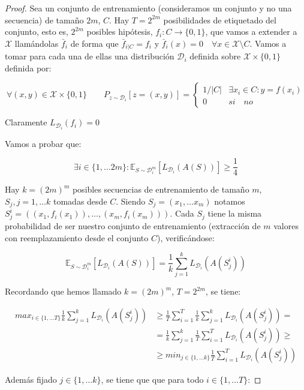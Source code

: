 \documentclass[11pt]{article}
\begin{document}
\begin{proof}
Sea un conjunto de entrenamiento (consideramos un conjunto y no una secuencia) de tamaño $2m$, $C$. Hay $T = 2^{2m}$ posibilidades de etiquetado del conjunto, esto es, $2^{2m}$ posibles hipótesis, $f_i: C\rightarrow \{0,1\}$, que vamos a extender a $\mathcal{X}$ llamándolas $\bar{f}_i$ de forma que $\bar{f}_{i|C} = f_i$ y $\bar{f}_i(x) = 0 \quad \forall x\in \mathcal{X}\setminus C$. Vamos a tomar para cada una de ellas una distribución $\mathcal{D}_i$ definida sobre $\mathcal{X} \times \{0,1\}$ definida por:


\[\forall (x,y)\in \mathcal{X} \times \{0,1\} \qquad P_{z\sim \mathcal{D}_i} [z = (x,y)] = \left\{\begin{array}{ll}
1/|C| & \exists x_i \in C : y=f(x_i)\\
0     & si \quad no
\end{array}\right.\]

Claramente $L_{\mathcal{D}_i}(f_i) = 0$

Vamos a probar que:

\[\exists i\in \{1, \ldots 2m\} : \mathbb{E}_{S\sim \mathcal{D}_i^m} [L_{\mathcal{D}_i} (A(S))] \ge \frac{1}{4}\]

Hay $k = (2m)^m$ posibles secuencias de entrenamiento de tamaño $m$, $S_j, j=1, \ldots k$ tomadas desde $C$. Siendo $S_j = (x_1, \ldots x_m)$ notamos $S_j^i = ((x_1, f_i(x_1)), \ldots, (x_m, f_i(x_m)))$. Cada $S_j$ tiene la misma probabilidad de ser nuestro conjunto de entrenamiento (extracción de $m$ valores con reemplazamiento desde el conjunto $C$), verificándose:

\[\mathbb{E}_{S\sim \mathcal{D}_i^m} [L_{\mathcal{D}_i} (A(S))] = \frac{1}{k} \sum_{j=1}^k L_{\mathcal{D}_i} (A(S_j^i))\]

Recordando que hemos llamado $k=(2m)^m$, $T=2^{2m}$, se tiene:

\begin{align*}
max_{i \in \{1,\ldots T\}} \frac{1}{k} \sum_{j=1}^{k} L_{\mathcal{D}_i} (A(S_j^i)) &\ge 
       \frac{1}{T} \sum_{i=1}^{T} \frac{1}{k} \sum_{j=1}^{k}  L_{\mathcal{D}_i} (A(S_j^i))   =\\
&=     \frac{1}{k} \sum_{j=1}^{k} \frac{1}{T} \sum_{i=1}^{T}  L_{\mathcal{D}_i} (A(S_j^i)) \ge\\
&\ge min_{j \in \{1, \ldots k\}} \frac{1}{T} \sum_{i=1}^{T}  L_{\mathcal{D}_i} (A(S_j^i))
\end{align*}


Además fijado $j \in \{1,\ldots k\}$, se tiene que que para todo $i \in \{1,\ldots T\}$:


\end{proof}
\end{document}

